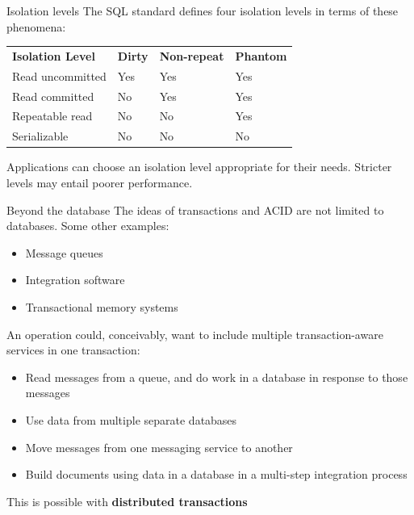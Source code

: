 \documentclass[svgnames]{beamer}
\begin{document}
\begin{frame}{Isolation levels}
    The SQL standard defines four isolation levels in terms of these
    phenomena: \\
    \vspace{.5cm}
    \begin{tabular}{llll}
        \textbf{Isolation Level} & \textbf{Dirty} &
        \textbf{Non-repeat} & \textbf{Phantom} \\
        Read uncommitted & Yes & Yes & Yes \\
        Read committed & No & Yes & Yes \\
        Repeatable read & No & No & Yes \\
        Serializable & No & No & No
    \end{tabular}
    \vspace{10pt} \par
    Applications can choose an isolation level appropriate for their needs.
    Stricter levels may entail poorer performance.
\end{frame}

\begin{frame}{Beyond the database}
    The ideas of transactions and ACID are not limited to databases. Some other examples: \\

    \begin{itemize}
        \item Message queues
        \item Integration software
        \item Transactional memory systems
    \end{itemize}
\end{frame}

\begin{frame}
    An operation could, conceivably, want to include multiple transaction-aware services in one transaction:
    \begin{itemize}
        \item Read messages from a queue, and do work in a database in response to those messages
        \item Use data from multiple separate databases
        \item Move messages from one messaging service to another
        \item Build documents using data in a database in a multi-step integration process
    \end{itemize}
    This is possible with \textbf{distributed transactions}
\end{frame}
\end{document}
